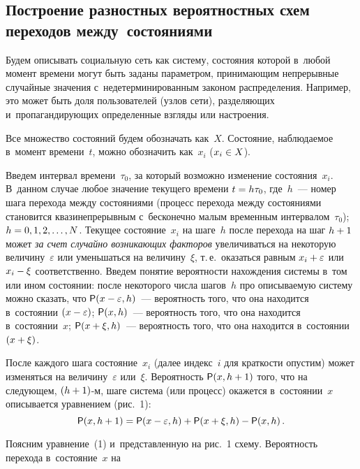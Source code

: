 \begin{multicols}{2}
\subsection{Построение разностных вероятностных схем переходов 
между~состояниями} %

  Будем описывать социальную сеть как систему, состояния которой в~любой 
момент времени могут быть заданы параметром, принимающим непрерывные 
случайные значения с~недетерминированным законом распределения. 
Например, это может быть доля пользователей (узлов сети), раз\-де\-ля\-ющих 
и~пропагандирующих определенные взгляды или настроения.
  
  Все множество состояний будем обозначать как~$X$. Состояние, 
наблюдаемое в~момент времени~$t$, можно обозначить как~$x_i$ ($x_i\hm\in  
{X}$).
  
  Введем интервал времени~$\tau_0$, за который возможно изменение 
состояния~$x_i$. В~данном случае любое значение текущего времени 
$t\hm=h\tau_0$, где~$h$~--- номер шага перехода между состояниями 
(процесс перехода между состояниями становится квазинепрерывным 
с~бесконечно малым временным интервалом~$\tau_0$); $h\hm=0, 1, 2, \ldots, 
N$. Текущее состояние~$x_i$ на шаге~$h$ после перехода на шаг $h\hm+1$ 
может \textit{за счет случайно возникающих факторов} увеличиваться на 
некоторую величину~$\varepsilon$ или уменьшаться на величину~$\xi$, т.\,е.\ 
оказаться равным $x_i\hm+\varepsilon$ или $x_i\hm- \xi$ 
соответственно. Введем понятие вероятности нахождения системы в~том или 
ином состоянии: после некоторого числа шагов~$h$ про описываемую систему 
можно сказать, что ${\sf P}(x\hm- \varepsilon, h)$~--- вероятность того, что она 
находится в~состоянии $(x\hm - \varepsilon)$; ${\sf P}(x,h)$~--- вероятность того, что 
она находится в~состоянии~$x$; ${\sf P}(x\hm+\xi, h)$~--- вероятность того, что она 
находится в~состоянии $(x\hm + \xi)$.
  
  После каждого шага состояние~$x_i$ (далее индекс~$i$ для краткости 
опустим) может изменяться на величину~$\varepsilon$ или~$\xi$. Вероятность 
${\sf P}(x, h\hm+1)$ того, что на следующем, $(h\hm+1)$-м, шаге система (или 
процесс) окажется в~состоянии~$x$ описывается уравнением (рис.~1):
  \begin{equation}
  {\sf P}(x, h+1)= {\sf P}(x - \varepsilon, h)+{\sf P}(x+\xi, h) - {\sf P}(x, h)\,.
  \label{e1-hv}
  \end{equation}



  Поясним уравнение~(1) и~представленную на рис.~1 схему. Вероятность 
перехода в~состояние~$x$ на\linebreak\vspace*{-12pt}


\end{multicols}
